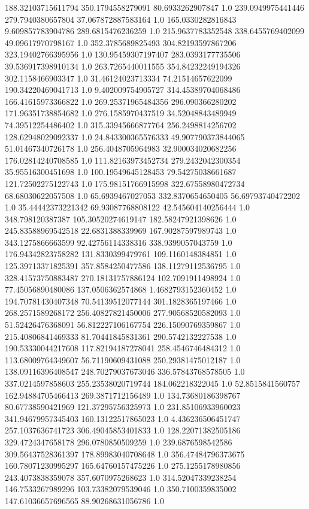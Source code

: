 188.32103715611794	350.1794558279091	80.6933262907847	1.0
239.0949975441446	279.7940380657804	37.067872887583164	1.0
165.0330282816843	9.609857783904786	289.6815476236259	1.0
215.9637783352548	338.6455769402099	49.09617970798167	1.0
352.3785689825493	304.82193597867206	323.19402766395956	1.0
130.95459307197407	283.0393177735506	39.536917398910134	1.0
263.7265440011555	354.84232249194326	302.1158466903347	1.0
31.46124023713334	74.21514657622099	190.34220469041713	1.0
9.402009754905727	314.45389704068486	166.41615973366822	1.0
269.25371965484356	296.090366280202	171.96351738854682	1.0
276.1585970437519	34.52048843489949	74.39512254486402	1.0
315.33945666877764	256.2498814256702	128.62948029092337	1.0
24.843300365576333	49.907790373844065	51.01467340726178	1.0
256.4048705964983	32.900034020682256	176.02814240708585	1.0
111.82163973452734	279.2432042300354	35.95516300451698	1.0
100.19549645128453	79.54275038661687	121.72502275122743	1.0
175.98151766915998	322.67558980472734	68.68030622057508	1.0
65.6939467027053	332.8370654650405	56.69793740472202	1.0
35.44442373221342	69.93087768808122	42.545604140256444	1.0
348.798120387387	105.30520274619147	182.58247921398626	1.0
245.83588969542518	22.6831388339969	167.90287597989743	1.0
343.1275866663599	92.42756114338316	338.9399057043759	1.0
176.94342823758282	131.8330399479761	109.1160148384851	1.0
125.39713371825391	357.8584250477586	138.11279112536795	1.0
328.41573750883487	270.18131757886124	102.7091911498924	1.0
77.45056890480086	137.0506362574868	1.4682793152360452	1.0
194.70781430407348	70.54139512077144	301.1828365197466	1.0
268.2571589268172	256.40827821450006	277.90568520582093	1.0
51.52426476368091	56.812227106167754	226.15090769359867	1.0
215.40806841469333	81.70441845831361	290.5742132227538	1.0
190.53330044217608	117.82194187278041	258.4546746484312	1.0
113.68009764349607	56.71190609431088	250.29381475012187	1.0
138.09116396408547	248.70279037673046	336.57843768578505	1.0
337.0214597858603	255.23538020719744	184.062218322045	1.0
52.8515841560757	162.94884705466413	269.3871712156489	1.0
134.73680186398767	80.67738590421969	121.37295756325973	1.0
231.85106933960023	341.94679957345403	160.13122517865023	1.0
4.436236506451747	257.1037636741723	306.49045853401833	1.0
128.22071382505186	329.4724347658178	296.0780850509259	1.0
239.6876598542586	309.56437528361397	178.89983040708648	1.0
356.47484796373675	160.78071230995297	165.64760157475226	1.0
275.1255178980856	243.4073838359078	357.6070975268623	1.0
314.52047339238254	146.7533267989296	103.73382079539046	1.0
350.7100359835002	147.61036657696565	88.90268631056786	1.0
